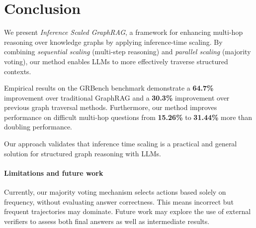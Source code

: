 \section{Conclusion}






We present \textit{Inference Scaled GraphRAG}, a framework for enhancing multi-hop reasoning over knowledge graphs by applying inference-time scaling. By combining \textit{sequential scaling} (multi-step reasoning) and \textit{parallel scaling} (majority voting), our method enables LLMs to more effectively traverse structured contexts.

Empirical results on the GRBench benchmark demonstrate a \textbf{64.7\%} improvement over traditional GraphRAG and a \textbf{30.3\%} improvement over previous graph traversal methods. Furthermore, our method improves performance on difficult multi-hop questions from \textbf{15.26\%} to \textbf{31.44\%} more than doubling performance. 

Our approach validates that inference time scaling is a practical and general solution for structured graph reasoning with LLMs. 

\paragraph{Limitations and future work}
Currently, our majority voting mechanism selects actions based solely on frequency, without evaluating answer correctness. This means incorrect but frequent trajectories may dominate. Future work may explore the use of external verifiers to assess both final answers as well as intermediate results. 

